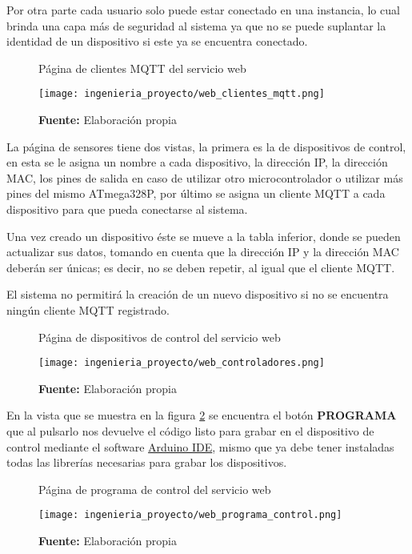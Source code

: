 \documentclass[../principal]{subfiles}
\begin{document}
  Por otra parte cada usuario solo puede estar conectado en una instancia, lo cual brinda una capa más de seguridad al sistema ya que no se puede suplantar la identidad de un dispositivo si este ya se encuentra conectado.

  \begin{figure}[H]
    \centering
    \caption{Página de clientes MQTT del servicio web}
    \texttt{[image: ingenieria\_proyecto/web\_clientes\_mqtt.png]}
    \caption*{\textbf{Fuente:} Elaboración propia}
    \label{fig:web_clientes_mqtt}
  \end{figure}

  La página de sensores tiene dos vistas, la primera es la de dispositivos de control, en esta se le asigna un nombre a cada dispositivo, la dirección IP, la dirección MAC, los pines de salida en caso de utilizar otro microcontrolador o utilizar más pines del mismo ATmega328P, por último se asigna un cliente MQTT a cada dispositivo para que pueda conectarse al sistema.

  Una vez creado un dispositivo éste se mueve a la tabla inferior, donde se pueden actualizar sus datos, tomando en cuenta que la dirección IP y la dirección MAC deberán ser únicas; es decir, no se deben repetir, al igual que el cliente MQTT.

  El sistema no permitirá la creación de un nuevo dispositivo si no se encuentra ningún cliente MQTT registrado.

  \begin{figure}[H]
    \centering
    \caption{Página de dispositivos de control del servicio web}
    \texttt{[image: ingenieria\_proyecto/web\_controladores.png]}
    \caption*{\textbf{Fuente:} Elaboración propia}
    \label{fig:web_controladores}
  \end{figure}

  En la vista que se muestra en la figura \ref{fig:web_controladores} se encuentra el botón \textbf{PROGRAMA} que al pulsarlo nos devuelve el código listo para grabar en el dispositivo de control mediante el software \href{https://www.arduino.cc/en/main/software}{Arduino IDE}, mismo que ya debe tener instaladas todas las librerías necesarias para grabar los dispositivos.

  \begin{figure}[H]
    \centering
    \caption{Página de programa de control del servicio web}
    \texttt{[image: ingenieria\_proyecto/web\_programa\_control.png]}
    \caption*{\textbf{Fuente:} Elaboración propia}
    \label{fig:web_programa_control}
  \end{figure}
\end{document}
